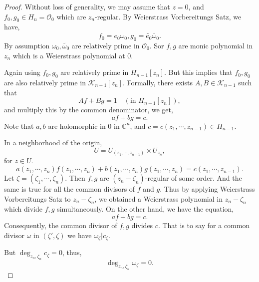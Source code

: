 \documentclass{article}
\newcommand{\C}[0]{\mathbb{C}}
\begin{document}
\begin{proof}
  Without loss of generality, we may assume that $z=0$, and $f_0,g_0\in H_n=\mathcal{O}_0$ which are $z_n$-regular. By Weierstrass Vorbereitungs Satz, we have,
  \begin{equation*}
    f_0 = e_0\omega_0,g_0=\tilde{e_0}\tilde{\omega_0}.
  \end{equation*} 
  By assumption $\omega_0,\tilde{\omega_0}$ are relatively prime in $\mathcal{O}_0$. Sor $f,g$ are monic polynomial in $z_n$ which is a Weierstrass polynomial at $0$.
  \par Again using $f_0,g_0$ are relatively prime in $H_{n-1}[z_n]$. But this implies that $f_0,g_0$ are also relatively prime in $\mathcal{K}_{n-1}[z_n]$. Formally, there exists $A,B\in\mathcal{K}_{n-1}$ such that 
  \begin{equation*}
    Af+Bg = 1\quad(\text{in $H_{n-1}[z_n]$}),
  \end{equation*}
  and multiply this by the common denominator, we get,
  \begin{equation*}
    af+bg = c.
  \end{equation*}
  Note that $a,b$ are holomorphic in $0$ in $\C^n$, and $c = c(z_1,\cdots,z_{n-1})\in H_{n-1}$. 
  \par In a neighborhood of the origin,
  \begin{equation*}
    U = U_{(z_1,\cdots,z_{n-1})}\times U_{z_n},
  \end{equation*}
  for $z\in U$. 
  \begin{equation*}
    a(z_1,\cdots,z_n)f(z_1,\cdots,z_n)+b(z_1,\cdots,z_n)g(z_1,\cdots,z_n) = c(z_1,\cdots,z_{n-1}).
  \end{equation*}
  Let $\zeta = (\zeta_1,\cdots,\zeta_n)$. Then $f,g$ are $(z_n-\zeta_n)$-regular of some order. And the same is true for all the common divisors of $f$ and $g$. Thus by applying Weierstrass Vorbereitungs Satz to $z_n-\zeta_n$, we obtained a Weierstrass polynomial in $z_n-\zeta_n$ which divide $f,g$ simultaneously.
  On the other hand, we have the equation, 
  \begin{equation*}
    af+bg = c.
  \end{equation*} 
  Consequently, the common divisor of $f,g$ divides $c$. That is to say for a common divisor $\omega$ in $(\zeta',\zeta)$ we have $\omega_\zeta|c_\zeta$.
  \par But $\deg_{z_n,\zeta_n}c_\zeta = 0$, thus,
  \begin{equation*}
    \deg_{z_n,\zeta_n}\omega_\zeta = 0.
  \end{equation*}

\end{proof}
\end{document}

